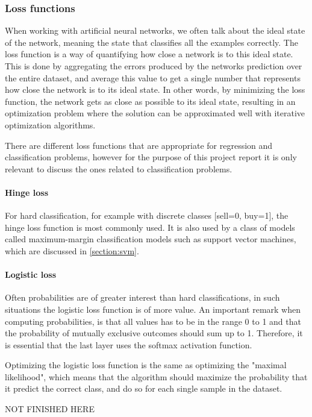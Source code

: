 \subsubsection{Loss functions}
When working with artificial neural networks, we often talk about the ideal state of the network, meaning the state that classifies all the examples correctly. The loss function is a way of quantifying how close a network is to this ideal state. This is done by aggregating the errors produced by the networks prediction over the entire dataset, and average this value to get a single number that represents how close the network is to its ideal state. In other words, by minimizing the loss function, the network gets as close as possible to its ideal state, resulting in an optimization problem where the solution can be approximated well with iterative optimization algorithms.

There are different loss functions that are appropriate for regression and classification problems, however for the purpose of this project report it is only relevant to discuss the ones related to classification problems.

\paragraph{Hinge loss}
For hard classification, for example with discrete classes [sell=0, buy=1], the hinge loss function is most commonly used. It is also used by a class of models called maximum-margin classification models such as support vector machines, which are discussed in \autoref{section:svm}.

\paragraph{Logistic loss}
Often probabilities are of greater interest than hard classifications, in such situations the logistic loss function is of more value. An important remark when computing probabilities, is that all values has to be in the range 0 to 1 and that the probability of mutually exclusive outcomes should sum up to 1. Therefore, it is essential that the last layer uses the softmax activation function.

Optimizing the logistic loss function is the same as optimizing the "maximal likelihood", which means that the algorithm should maximize the probability that it predict the correct class, and do so for each single sample in the dataset. 

NOT FINISHED HERE

